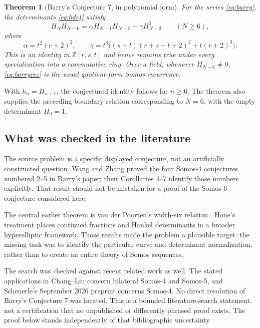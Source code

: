 \documentclass[11pt,a4paper]{article}
\numberwithin{equation}{section}
\newtheorem{theorem}{Theorem}[section]
\theoremstyle{definition}
\newcommand{\Z}{\mathbb Z}
\begin{document}
\begin{theorem}[Barry's Conjecture 7, in polynomial form]\label{thm:barry}
For the series \eqref{eq:barry}, the determinants \eqref{eq:hdef} satisfy
\begin{equation}\label{eq:barryrec}
 H_NH_{N-6}=\alpha H_{N-1}H_{N-5}+\gamma H_{N-3}^2
 \qquad(N\geq6),
\end{equation}
where
\begin{equation}\label{eq:barrycoeff}
 \alpha=t^2(r+2)^2,\qquad
 \gamma=t^3\bigl((s+t)(r+s+t+2)^2+t(r+2)^3\bigr).
\end{equation}
This is an identity in $\Z[r,s,t]$ and hence remains true under every
specialization into a commutative ring. Over a field, whenever $H_{N-6}\ne0$,
\eqref{eq:barryrec} is the usual quotient-form Somos recurrence.
\end{theorem}

With $h_n=H_{n+1}$, the conjectured identity follows for $n\geq6$. The theorem
also supplies the preceding boundary relation corresponding to $N=6$, with
the empty determinant $H_0=1$.

\subsection{What was checked in the literature}
The source problem is a specific displayed conjecture, not an artificially
constructed question. Wang and Zhang \cite{WangZhang2024} proved the four
Somos-4 conjectures numbered 2--5 in Barry's paper; their Corollaries 4--7
identify those numbers explicitly. That result should not be mistaken for a
proof of the Somos-6 conjecture considered here.

The central earlier theorem is van der Poorten's width-six relation
\cite[Theorems 3.1--3.2]{vdP2005}. Hone's treatment
\cite[Section 4 and Theorem 5.4]{Hone2021} places continued fractions and
Hankel determinants in a broader hyperelliptic framework. Those results
made the problem a plausible target: the missing task was to identify the
particular curve and determinant normalization, rather than to create an
entire theory of Somos sequences.

The search was checked against recent related work as well. The stated
applications in Chang--Liu \cite{ChangLiu2026} concern bilateral Somos-4 and
Somos-5, and Scheuerle's September 2026 preprint \cite{Scheuerle2026} concerns
Somos-4. No direct resolution of Barry's Conjecture 7 was located. This is a
bounded literature-search statement, not a certification that no unpublished
or differently phrased proof exists. The proof below stands independently
of that bibliographic uncertainty.
\end{document}
